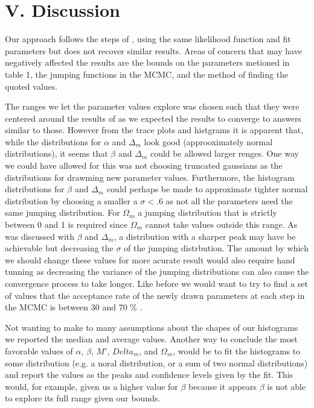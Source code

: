 \documentclass[aps,prl,reprint]{revtex4-1}
\begin{document}
\section{V. Discussion}
Our approach follows the steps of \cite{sdss}, using the same likelihood function and fit parameters but does not recover similar results. Areas of concern that may have negatively affected the results are the bounds on the parameters metioned in table 1, the jumping functions in the MCMC, and the method of finding the quoted values.

The ranges we let the parameter values explore was chosen such that they were centered around the results of \cite{sdss} as we expected the results to converge to answers similar to those. However from the trace plots and histgrams it is apparent that, while the distributions for $\alpha$ and $\Delta_m$ look good (approoximately normal distributions), it seems that $\beta$ and $\Delta_m$ could be allowed larger renges. One way we could have allowed for this was not choosing truncated gaussians as the distributions for drawming new parameter values. Furthermore, the histogram distributions for $\beta$ and $\Delta_m$ could perhaps be made to approximate tighter normal distribution by choosing a smaller a $\sigma < .6$ as not all the parameters need the same jumping distribution. 
For $\Omega_m$ a jumping distribution that is strictly between 0 and 1 is required since $\Omega_m$ cannot take values outside this range. As was discussed with $\beta$ and $\Delta_m$, a distribution with a sharper peak may have be achievable but decreasing the $\sigma$ of the jumping distrbution. The amount by which we should change these values for more acurate result would also require hand tunning as decreasing the variance of the jumping distributions can also cause the convergence process to take longer. Like before we would want to try to find a set of values that the acceptance rate of the newly drawn parameters at each step in the MCMC is between 30 and 70 \% \cite{MC}.

Not wanting to make to many assumptions about the shapes of our histograms we reported the median and average values. Another way to conclude the most favorable values of $\alpha$, $\beta$, $M'$, $Delta_m$, and $\Omega_m$, would be to fit the histograms to some distribution (e.g. a noral distribution, or a sum of two normal distributions) and report the values as the peaks and confidence levels given by the fit. This would, for example, given us a  higher value for $\beta$ because it appears $\beta$ is not able to explore its full range given our bounds.
\end{document}
